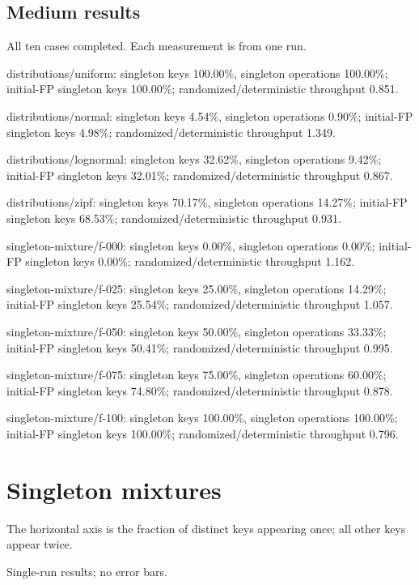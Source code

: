 \subsection*{Medium results}
All ten cases completed. Each measurement is from one run.\par
distributions/uniform: singleton keys 100.00\%, singleton operations 100.00\%; initial-FP singleton keys 100.00\%; randomized/deterministic throughput 0.851.\par
distributions/normal: singleton keys 4.54\%, singleton operations 0.90\%; initial-FP singleton keys 4.98\%; randomized/deterministic throughput 1.349.\par
distributions/lognormal: singleton keys 32.62\%, singleton operations 9.42\%; initial-FP singleton keys 32.01\%; randomized/deterministic throughput 0.867.\par
distributions/zipf: singleton keys 70.17\%, singleton operations 14.27\%; initial-FP singleton keys 68.53\%; randomized/deterministic throughput 0.931.\par
singleton-mixture/f-000: singleton keys 0.00\%, singleton operations 0.00\%; initial-FP singleton keys 0.00\%; randomized/deterministic throughput 1.162.\par
singleton-mixture/f-025: singleton keys 25.00\%, singleton operations 14.29\%; initial-FP singleton keys 25.54\%; randomized/deterministic throughput 1.057.\par
singleton-mixture/f-050: singleton keys 50.00\%, singleton operations 33.33\%; initial-FP singleton keys 50.41\%; randomized/deterministic throughput 0.995.\par
singleton-mixture/f-075: singleton keys 75.00\%, singleton operations 60.00\%; initial-FP singleton keys 74.80\%; randomized/deterministic throughput 0.878.\par
singleton-mixture/f-100: singleton keys 100.00\%, singleton operations 100.00\%; initial-FP singleton keys 100.00\%; randomized/deterministic throughput 0.796.\par
\clearpage
\section{Singleton mixtures}
The horizontal axis is the fraction of distinct keys appearing once; all other keys appear twice.

\begin{center}\small Single-run results; no error bars.\end{center}
\clearpage
